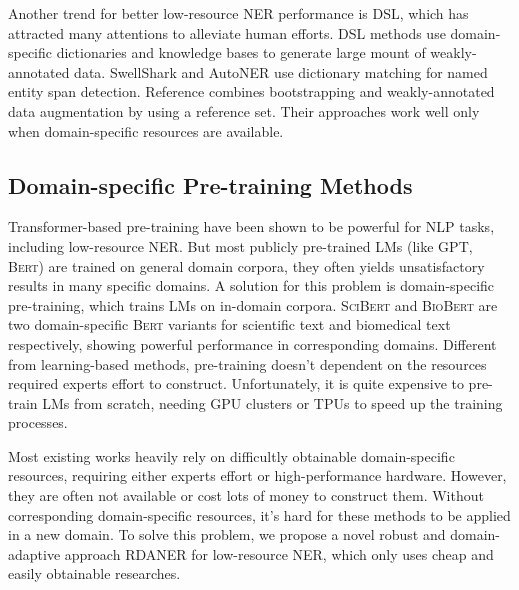 \documentclass[10pt, conference, compsocconf]{IEEEtran}
\newcommand{\bert}{\textsc{Bert}\xspace}
\newcommand{\scibert}{\textsc{SciBert}\xspace}
\newcommand{\biobert}{\textsc{BioBert}\xspace}
\newcommand{\rdaner}{\textsc{RDANER}\xspace}
\begin{document}
Another trend for better low-resource NER performance is DSL, which has attracted many attentions
to alleviate human efforts. DSL methods use domain-specific dictionaries and knowledge bases to
generate large mount of weakly-annotated data. 
SwellShark\cite{fries2017swellshark} and AutoNER\cite{shang-etal-2018-learning} use dictionary matching 
for named entity span detection. Reference\cite{mathew2019biomedical} combines bootstrapping
and weakly-annotated data augmentation by using a reference set. Their approaches work well only
when domain-specific resources are available.








\subsection{Domain-specific Pre-training Methods}
Transformer-based pre-training
have been shown to be powerful for NLP tasks\cite{devlin2018bert,yang2019xlnet}, including low-resource NER.
But most publicly pre-trained LMs (like GPT, \bert) are trained on general domain corpora, 
they often yields unsatisfactory results in many specific domains. A solution for this problem is domain-specific pre-training,
which trains LMs on in-domain corpora.
\scibert\cite{beltagy-etal-2019-scibert} and \biobert\cite{lee2020biobert}
are two domain-specific \bert variants for scientific text and biomedical text respectively,
showing powerful performance in corresponding domains. 
Different from learning-based methods, pre-training doesn't dependent on
the resources required experts effort to construct. Unfortunately, 
it is quite expensive to pre-train LMs from scratch,
needing GPU clusters or TPUs to speed up the training processes. 
















Most existing works heavily rely on difficultly obtainable domain-specific resources, requiring either experts effort or  
high-performance hardware. However, they are often not available or cost lots of money to 
construct them. Without corresponding domain-specific resources, 
it's hard for these methods to be applied in a new domain.
To solve this problem, we propose a novel robust and domain-adaptive approach \rdaner for low-resource
NER, which only uses cheap and easily obtainable researches.
\end{document}
